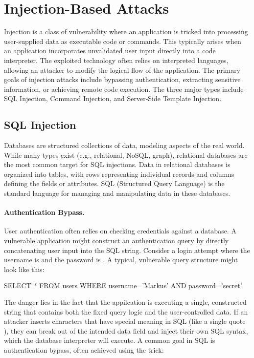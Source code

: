 \section{Injection-Based Attacks}
Injection is a class of vulnerability where an application is tricked into processing user-supplied data as executable code or commands. This typically arises when an application incorporates unvalidated user input directly into a code interpreter. The exploited technology often relies on interpreted languages, allowing an attacker to modify the logical flow of the application. The primary goals of injection attacks include bypassing authentication, extracting sensitive information, or achieving remote code execution. The three major types include SQL Injection, Command Injection, and Server-Side Template Injection.

\subsection{SQL Injection}
Databases are structured collections of data, modeling aspects of the real world. While many types exist (e.g., relational, NoSQL, graph), relational databases are the most common target for SQL injections. Data in relational databases is organized into tables, with rows representing individual records and columns defining the fields or attributes. SQL (Structured Query Language) is the standard language for managing and manipulating data in these databases.

\paragraph{Authentication Bypass.} User authentication often relies on checking credentials against a database. A vulnerable application might construct an authentication query by directly concatenating user input into the SQL string. Consider a login attempt where the username is  and the password is . A typical, vulnerable query structure might look like this:

\begin{sqlcode}
    SELECT * FROM users WHERE username='Markus' AND password='secret'
\end{sqlcode}

The danger lies in the fact that the appilcation is executing a single, constructed string that contains both the fixed query logic and the user-controlled data. If an attacker inserts characters that have special meaning in SQL (like a single quote ), they can break out of the intended data field and inject their own SQL syntax, which the database interpreter will execute. A common goal in SQL is authentication bypass, often achieved using the  trick:

